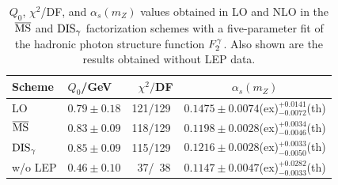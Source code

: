 \documentclass[aps,prl,twocolumn,groupedaddress]{revtex4}
\begin{document}
%
\begin{table}
\caption{\label{tab:2}$Q_0$, $\chi^2$/DF,
         and $\alpha_s(m_Z)$ values obtained in LO and
         NLO in the $\overline{\rm MS}$ and ${\rm DIS}_\gamma$ factorization schemes with a
         five-parameter fit of
         the hadronic  photon structure function $\f2y$. Also shown are the 
         results obtained without LEP data.}
\begin{ruledtabular}
\begin{tabular}{lllc}
       Scheme & $Q_0$/GeV &~$\chi^2/$DF& $\alpha_s(m_Z)$ \\
\hline
       LO     & $0.79\pm0.18$&121/129& $0.1475\pm0.0074$(ex)$^{+0.0141}_{-0.0072}$(th)\\
       $\overline{\rm MS}$  & $0.83\pm0.09$&118/129& $0.1198\pm0.0028$(ex)$^{+0.0034}_{-0.0046}$(th)\\
       ${\rm DIS}_\gamma$& $0.85\pm0.09$&115/129& $0.1216\pm0.0028$(ex)$^{+0.0033}_{-0.0050}$(th)\\
\hline
       w/o LEP& $0.46\pm0.10$&~37/~38& $0.1147\pm0.0047$(ex)$^{+0.0282}_{-0.0033}$(th)\\
\end{tabular}
\end{ruledtabular}
\end{table}
\end{document}
